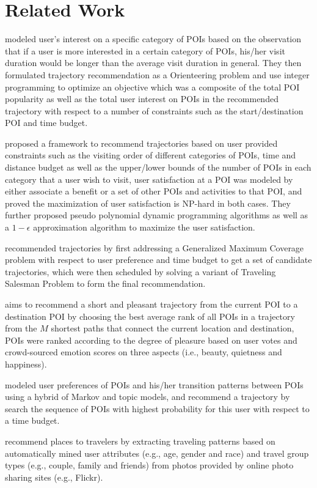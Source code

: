 \section{Related Work}
\label{relatedwork}

\cite{ijcai15} modeled user's interest on a specific category of POIs based on the observation that if a user is more interested in a 
certain category of POIs, his/her visit duration would be longer than the average visit duration in general.
They then formulated trajectory recommendation as a Orienteering problem and use integer programming to optimize an objective
which was a composite of the total POI popularity as well as the total user interest on POIs in the recommended trajectory 
with respect to a number of constraints such as the start/destination POI and time budget.

\cite{wsdm14} proposed a framework to recommend trajectories based on user provided constraints such as the visiting order of different 
categories of POIs, time and distance budget as well as the upper/lower bounds of the number of POIs in each category that a user wish 
to visit, user satisfaction at a POI was modeled by either associate a benefit or a set of other POIs and activities to that POI,
and proved the maximization of user satisfaction is NP-hard in both cases. 
They further proposed pseudo polynomial dynamic programming algorithms as well as 
a $1-\epsilon$ approximation algorithm to maximize the user satisfaction.

\cite{tripbuilder15} recommended trajectories by first addressing a Generalized Maximum Coverage problem with respect to user preference and 
time budget to get a set of candidate trajectories, which were then scheduled by solving a variant of Traveling Salesman Problem to form the 
final recommendation.

\cite{ht14} aims to recommend a short and pleasant trajectory from the current POI to a destination POI by choosing the best average rank 
of all POIs in a trajectory from the $M$ shortest paths that connect the current location and destination,
POIs were ranked according to the degree of pleasure based on user votes and  crowd-sourced emotion scores on three aspects 
(i.e., beauty, quietness and happiness).

\cite{geophoto13} modeled user preferences of POIs and his/her transition patterns between POIs using a hybrid of 
Markov and topic models, and recommend a trajectory by search the sequence of POIs with highest probability for this user 
with respect to a time budget.

\cite{travel13} recommend places to travelers by extracting traveling patterns based on automatically mined user attributes 
(e.g., age, gender and race) and travel group types (e.g., couple, family and friends) from photos provided by online photo 
sharing sites (e.g., Flickr).
